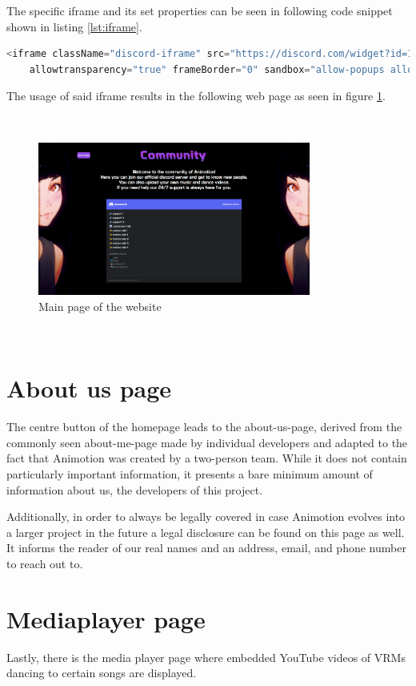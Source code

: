 The specific iframe and its set properties can be seen in following code snippet shown in listing \ref{lst:iframe}.

\begin{lstlisting}[language=Python,caption=iframe used for discord widget,label=lst:iframe]
    <iframe className="discord-iframe" src="https://discord.com/widget?id=1035647726634934382&theme=dark"
    allowtransparency="true" frameBorder="0" sandbox="allow-popups allow-popups-to-escape-sandbox allow-same-origin allow-scripts"></iframe>
\end{lstlisting}
The usage of said iframe results in the following web page as seen in figure \ref{fig:communitypage}.

\\
\begin{figure}[htb]
    \centering
    \includegraphics[width=0.8\textwidth]{pics/Animotion_community.png}
    \caption{Main page of the website}
    \label{fig:communitypage}
\end{figure}
\\

\section{About us page}
The centre button of the homepage leads to the about-us-page, derived from the commonly seen about-me-page
made by individual developers and adapted to the fact that Animotion was created by a two-person team. While
it does not contain particularly important information, it presents a bare minimum amount of information
about us, the developers of this project.

Additionally, in order to always be legally covered in case Animotion evolves into a larger project in the
future a legal disclosure can be found on this page as well. It informs the reader of our real names and an
address, email, and phone number to reach out to.

\section{Mediaplayer page}
Lastly, there is the media player page where embedded YouTube videos of VRMs dancing to certain songs are displayed.

